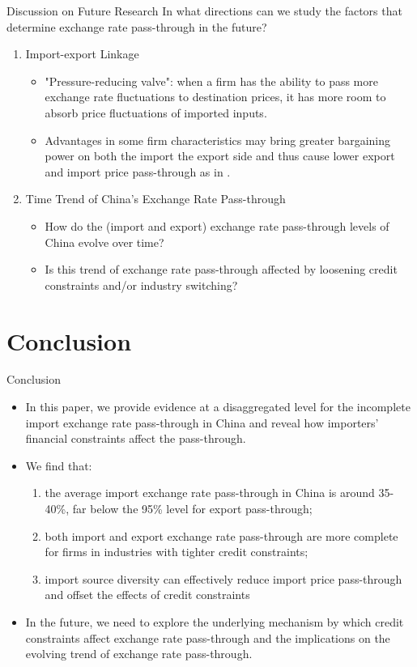 \documentclass[10pt]{beamer}
\begin{document}
\begin{frame}{Discussion on Future Research}
In what directions can we study the factors that determine exchange rate pass-through in the future?
	\begin{enumerate}
		\item Import-export Linkage
		\begin{itemize}
			\item "Pressure-reducing
			valve": when a firm has the ability to pass more exchange rate fluctuations to destination prices, it has more room to absorb price fluctuations of imported inputs.
			\item Advantages in some firm characteristics may bring
			greater bargaining power on both the import the export side and thus cause lower export and import price pass-through as in \cite{aik2014}.
		\end{itemize}
		\item Time Trend of China’s Exchange Rate Pass-through
		\begin{itemize}
			\item How do the (import and export) exchange rate pass-through levels of China evolve over time?
			\item Is this trend of exchange rate pass-through affected by loosening credit constraints and/or industry switching?
		\end{itemize}
	\end{enumerate}
\end{frame}

\section{Conclusion}

\begin{frame}{Conclusion}
	\begin{itemize}
		\item In this paper, we provide evidence at a disaggregated level for the incomplete import exchange rate pass-through in China and reveal how importers’ financial constraints affect the pass-through.
		\item We find that:
		\begin{enumerate}
			\item the average import exchange rate pass-through in China is around 35-40\%, far below the 95\% level for export pass-through;
			\item both import and export exchange rate pass-through are more complete for firms in industries with tighter credit constraints;
			\item import source diversity can effectively reduce import price pass-through and offset the effects of credit constraints
		\end{enumerate}
		\item In the future, we need to explore the underlying mechanism by which credit constraints affect exchange rate pass-through and the implications on the evolving trend of exchange rate pass-through. 
	\end{itemize}
\end{frame}
\end{document}
